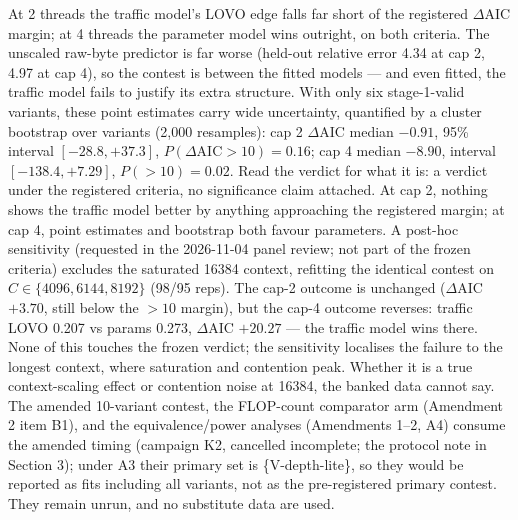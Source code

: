 \documentclass[10pt,letterpaper,twocolumn]{article}
\begin{document}
At 2 threads the traffic model's LOVO edge falls far short of the registered $\Delta$AIC margin; at 4 threads the parameter model wins outright, on both criteria. The unscaled raw-byte predictor is far worse (held-out relative error 4.34 at cap 2, 4.97 at cap 4), so the contest is between the fitted models ---
and even fitted, the traffic model fails to justify its extra
structure.
With only six stage-1-valid variants, these point estimates carry wide uncertainty, quantified by a cluster bootstrap over variants (2{,}000 resamples): cap 2
$\Delta$AIC median $-0.91$, 95\% interval $[-28.8, +37.3]$,
$P(\Delta\text{AIC}>10)=0.16$; cap 4 median $-8.90$, interval
$[-138.4, +7.29]$, $P(>10)=0.02$. Read the verdict for what
it is: a verdict under the registered criteria, no significance claim attached. At
cap 2, nothing shows the traffic model better by anything
approaching the registered margin; at cap 4, point estimates and
bootstrap both favour parameters.
A post-hoc sensitivity (requested in the 2026-11-04 panel review; not part of the
frozen criteria) excludes the saturated 16384 context, refitting the identical contest on $C\in\{4096,6144,8192\}$ (98/95 reps).
The cap-2 outcome is unchanged ($\Delta$AIC $+3.70$, still below the
$>10$ margin), but the cap-4 outcome reverses: traffic LOVO 0.207
vs params 0.273, $\Delta$AIC $+20.27$ --- the traffic model wins
there. None of this touches the frozen verdict; the sensitivity localises the failure to the longest context, where saturation and contention peak. Whether it is a true context-scaling
effect or contention noise at 16384, the banked data cannot say.
The amended 10-variant contest, the FLOP-count comparator arm
(Amendment 2 item B1), and the equivalence/power analyses
(Amendments 1--2, A4) consume the amended timing (campaign K2,
cancelled incomplete; the protocol note in Section 3); under A3
their primary set is \{V-depth-lite\}, so they would be reported
as fits including all variants, not as the pre-registered
primary contest. They remain unrun, and no substitute data
are used.
\end{document}
